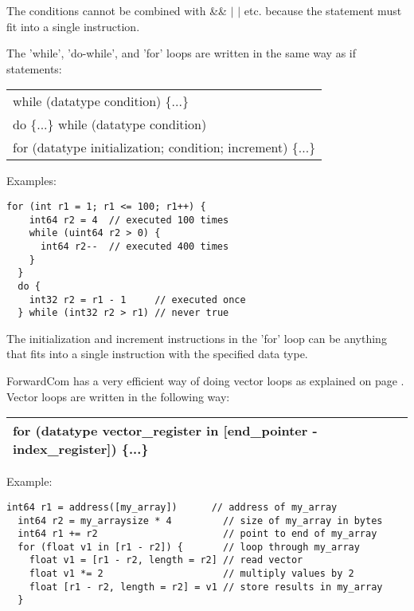 \documentclass[forwardcom.tex]{subfiles}
\begin{document}
The conditions cannot be combined with \&\& $\vert$ $\vert$ etc. because the statement must fit into a single instruction.
\vv

The 'while', 'do-while', and 'for' loops are written in the same way as if statements:

\begin{tabular}{|p{150mm}|}
\hline
\hspace{4mm} while (datatype condition) \{...\}\\
\hspace{4mm} do \{...\} while (datatype condition) \\
\hspace{4mm} for (datatype initialization; condition; increment) \{...\}\\
\hline
\end{tabular}
\vv

Examples:
\vv

\begin{lstlisting}[frame=single]
  for (int r1 = 1; r1 <= 100; r1++) {
    int64 r2 = 4  // executed 100 times
    while (uint64 r2 > 0) {
      int64 r2--  // executed 400 times
    }
  } 
  do {
    int32 r2 = r1 - 1     // executed once
  } while (int32 r2 > r1) // never true
\end{lstlisting}
\vv

The initialization and increment instructions in the 'for' loop can be anything that fits into a single instruction with the specified data type.
\vspace{4mm}

ForwardCom has a very efficient way of doing vector loops as explained on page \pageref{vectorLoops}. Vector loops are written in the following way:

\begin{tabular}{|p{150mm}|}
\hline
\hspace{4mm} for (datatype vector\_register in [end\_pointer - index\_register]) \{...\}\\
\hline
\end{tabular}
\vspace{4mm}

Example:

\begin{lstlisting}[frame=single]
  int64 r1 = address([my_array])      // address of my_array
  int64 r2 = my_arraysize * 4         // size of my_array in bytes
  int64 r1 += r2                      // point to end of my_array
  for (float v1 in [r1 - r2]) {       // loop through my_array
    float v1 = [r1 - r2, length = r2] // read vector
    float v1 *= 2                     // multiply values by 2
    float [r1 - r2, length = r2] = v1 // store results in my_array
  }
\end{lstlisting}
\vv
\end{document}
